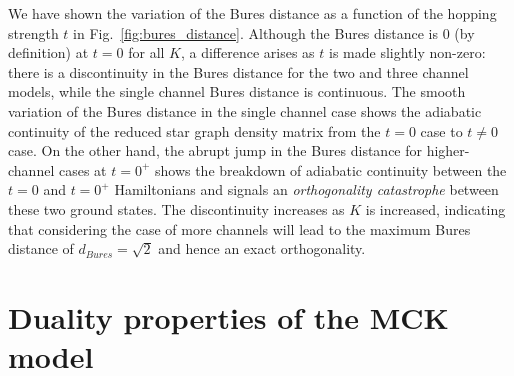 \documentclass{iopart}
\begin{document}
We have shown the variation of the Bures distance as a function of the hopping strength \(t\) in Fig.~\ref{fig:bures_distance}. Although the Bures distance is \(0\) (by definition) at \(t=0\) for all \(K\), a difference arises as \(t\) is made slightly non-zero: there is a discontinuity in the Bures distance for the two and three channel models, while the single channel Bures distance is continuous. The smooth variation of the Bures distance in the single channel case shows the adiabatic continuity of the reduced star graph density matrix from the $t=0$ case to $t\neq 0$ case. On the other hand, the abrupt jump in the Bures distance for higher-channel cases at $t=0^+$ shows the breakdown of adiabatic continuity between the \(t=0\) and \(t = 0^+\) Hamiltonians and signals an {\it orthogonality catastrophe} between these two ground states. The discontinuity increases as \(K\) is increased, indicating that considering the case of more channels will lead to the maximum Bures distance of $d_{Bures}=\sqrt{2}$ and hence an exact orthogonality.

\section{Duality properties of the MCK model}
\label{sec:duality}
\end{document}
